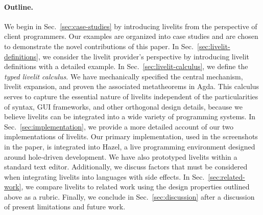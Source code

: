 \paragraph{Outline.} We begin in Sec.~\ref{sec:case-studies} by introducing
livelits from the perspective of client programmers. 
Our examples are organized into case studies 
and are chosen to demonstrate the novel contributions of this paper.
In Sec.~\ref{sec:livelit-definitions}, 
we consider the livelit provider's perspective by introducing livelit
definitions with a detailed example.
In Sec.~\ref{sec:livelit-calculus}, we define the \emph{typed livelit calculus}. 
We have mechanically specified the central mechanism, livelit expansion, and proven the associated metatheorems in Agda.
This calculus 
serves to capture the essential nature of livelits 
independent of the particularities of syntax, GUI frameworks, 
and other orthogonal design details,
because we believe livelits can be integrated into a wide variety of programming systems. 
In Sec.~\ref{sec:implementation}, we provide a more detailed account of our two implementations of livelits.
Our primary implementation, used in the screenshots in the paper,
is integrated into Hazel, a live programming environment designed 
around hole-driven development. 
We have also prototyped livelits within a standard text editor. 
Additionally, we discuss factors that must be considered when integrating livelits into languages with side effects.
In Sec.~\ref{sec:related-work}, we compare livelits to related work using the design properties outlined above 
as a rubric.
Finally, we conclude in Sec.~\ref{sec:discussion} after a discussion of present limitations and future work.